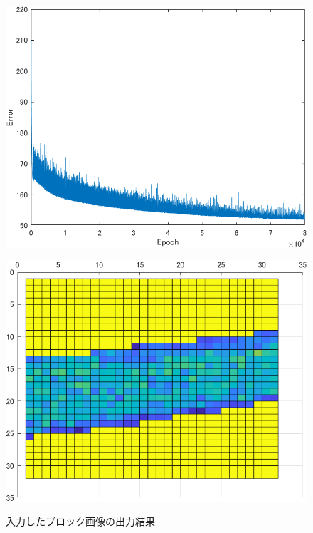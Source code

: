 \documentclass[twocolumn, a4j]{jsarticle}
\begin{document}
\begin{figure}[h]
  \begin{minipage}[]{0.49\columnwidth}
    \centering
    \includegraphics[width=0.9\columnwidth]{figure/archive_20241224_resul11-2.png}
    \label{fig:4-3-1}
  \end{minipage}
  \begin{minipage}[]{0.49\linewidth}
    \centering
    \includegraphics[width=0.9\columnwidth]{figure/untitled1.png}
    \label{fig:4-3-2}
  \end{minipage}
  \caption{入力したブロック画像の出力結果}
  \label{fig:4-3}
\end{figure}
\end{document}

